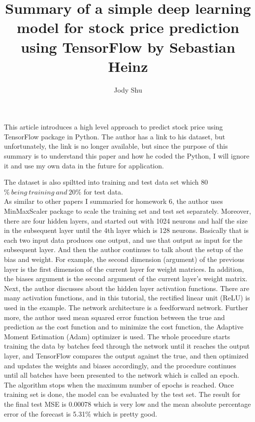 \documentclass[11pt, oneside]{article}   	%
\title{Summary of a simple deep learning model for stock price prediction using TensorFlow by Sebastian Heinz}
\author{Jody Shu}
\begin{document}
\begin{Large}
\maketitle

This article introduces a high level approach to predict stock price using TensorFlow package in Python.  The author has a link to his dataset, but unfortunately, the link is no longer available, but since the purpose of this summary is to understand this paper and how he coded the Python, I will ignore it and use my own data in the future for application.

The dataset is also spiltted into training and test data set which 80$\% \ being\ training \ and \ 20\%$ for test data.\\As similar to other papers I summaried for homework 6, the author uses MinMaxScaler package to scale the training set and test set separately. Moreover, there are four hidden layers, and started out with 1024 neurons and half the size in the subsequent layer until the 4th layer which is 128 neurons.  Basically that is each two input data produces one output, and use that output as input for the subsequent layer.  And then the author continues to talk about the setup of the bias and weight.  For example, the second dimension (argument) of the previous layer is the first dimension of the current layer for weight matrices.  In addition, the biases argument is the second argument of the current layer's weight matrix.\\

Next, the author discusses about the hidden layer activation functions.  There are many activation functions, and in this tutorial, the rectified linear unit (ReLU) is used in the example.  The network architecture is a feedforward network.  Further more, the author used mean squared error function between the true and prediction as the cost function and to minimize the cost function, the Adaptive Moment Estimation (Adam) optimizer is used.  
The whole procedure starts training the data by batches feed through the network until it reaches the output layer, and TensorFlow compares the output against the true, and then optimized and updates the weights and biases accordingly, and the procedure continues until all batches have been presented to the network which is called an epoch.  The algorithm stops when the maximum number of epochs is reached.  Once training set is done, the model can be evaluated by the test set.  The result for the final test MSE is 0.00078 which is very low and the mean absolute percentage error of the forecast is 5.31$\%$ which is pretty good.










\end{Large}
\end{document}
